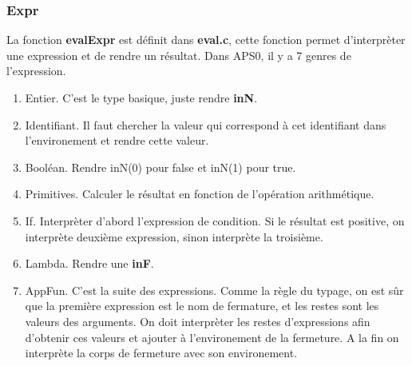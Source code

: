 \documentclass[14px]{article}
\begin{document}
\subsubsection{Expr}
La fonction \textbf{evalExpr} est définit dans \textbf{eval.c}, cette fonction permet d'interprèter une expression et de rendre un résultat. Dans APS0, il y a 7 genres de l'expression.
\begin{enumerate}
\item Entier. C'est le type basique, juste rendre \textbf{inN}.
\item Identifiant. Il faut chercher la valeur qui correspond à cet identifiant dans l'environement et rendre cette valeur.
\item Booléan. Rendre inN(0) pour false et inN(1) pour true.
\item Primitives. Calculer le résultat en fonction de l'opération arithmétique.
\item If. Interprèter d'abord l'expression de condition. Si le résultat est positive, on interprète deuxième expression, sinon interprète la troisième.
\item Lambda. Rendre une \textbf{inF}.
\item AppFun. C'est la suite des expressions. Comme la règle du typage, on est sûr que la première expression est le nom de fermature, et les restes sont les valeurs des arguments.
On doit interprèter les restes d'expressions afin d'obtenir ces valeurs et ajouter à l'environement de la fermeture. A la fin on interprète la corps de fermeture avec son environement.

\end{enumerate}



 
\end{document}

